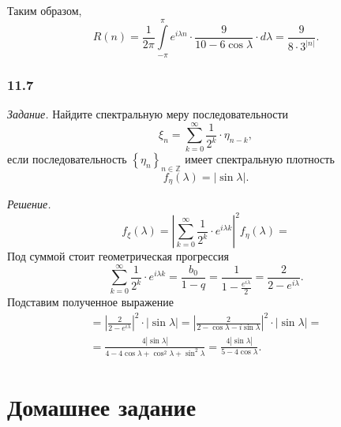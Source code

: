 Таким образом,
\begin{equation*}
  R \left( n \right) =
  \frac{1}{2 \pi }
  \int \limits_{-\pi }^{ \pi } e^{i \lambda n} \cdot \frac{9}{10 - 6 \cos \lambda} \cdot d \lambda =
  \frac{9}{8 \cdot 3^{ \left| n \right| }}.
\end{equation*}

\subsubsection*{11.7}

\textit{Задание.}
Найдите спектральную меру последовательности
\begin{equation*}
  \xi_n =
  \sum \limits_{k = 0}^{ \infty } \frac{1}{2^k} \cdot \eta_{n - k},
\end{equation*}
если последовательность $ \left\{ \eta_n \right\}_{n \in \mathbb{Z}}$
имеет спектральную плотность
\begin{equation*}
  f_{ \eta } \left( \lambda \right) =
  \left| \sin \lambda \right|.
\end{equation*}

\textit{Решение.}
\begin{equation*}
  f_{ \xi } \left( \lambda \right) =
  \left|
    \sum \limits_{k = 0}^{ \infty } \frac{1}{2^k} \cdot e^{i \lambda k}
  \right|^2 f_{ \eta } \left( \lambda \right) =
\end{equation*}
Под суммой стоит геометрическая прогрессия
\begin{equation*}
  \sum \limits_{k = 0}^{ \infty } \frac{1}{2^k} \cdot e^{i \lambda k} =
  \frac{b_0}{1 - q} =
  \frac{1}{1 - \frac{e^{i \lambda }}{2}} =
  \frac{2}{2 - e^{i \lambda }}.
\end{equation*}
Подставим полученное выражение
\begin{gather*}
  = \left| \frac{2}{2 - e^{i \lambda }} \right|^2 \cdot
  \left| \sin \lambda \right| =
  \left| \frac{2}{2 - \cos \lambda - i \sin \lambda } \right|^2 \cdot
  \left| \sin \lambda \right| = \\
  = \frac{4 \left| \sin \lambda \right| }{4 - 4 \cos \lambda + \cos^2 \lambda + \sin^2 \lambda } =
  \frac{4 \left| \sin \lambda \right| }{5 - 4 \cos \lambda }.
\end{gather*}

\section*{Домашнее задание}

